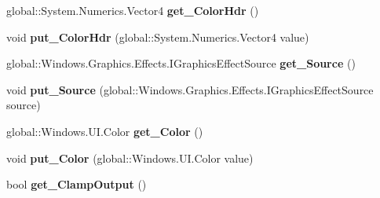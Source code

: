 \begin{DoxyCompactItemize}
global\+::\+System.\+Numerics.\+Vector4 {\bfseries get\+\_\+\+Color\+Hdr} ()
\item 
\mbox{\label{interface_microsoft_1_1_graphics_1_1_canvas_1_1_effects_1_1_i_tint_effect_ad0bd40be0fe7e352f9d1a9407f7c32a8}} 
void {\bfseries put\+\_\+\+Color\+Hdr} (global\+::\+System.\+Numerics.\+Vector4 value)
\item 
\mbox{\label{interface_microsoft_1_1_graphics_1_1_canvas_1_1_effects_1_1_i_tint_effect_aaf0626b4108a593e2255ee54368f6526}} 
global\+::\+Windows.\+Graphics.\+Effects.\+I\+Graphics\+Effect\+Source {\bfseries get\+\_\+\+Source} ()
\item 
\mbox{\label{interface_microsoft_1_1_graphics_1_1_canvas_1_1_effects_1_1_i_tint_effect_a956f6e4a96e8243eaea0b5c74184238f}} 
void {\bfseries put\+\_\+\+Source} (global\+::\+Windows.\+Graphics.\+Effects.\+I\+Graphics\+Effect\+Source source)
\item 
\mbox{\label{interface_microsoft_1_1_graphics_1_1_canvas_1_1_effects_1_1_i_tint_effect_a9740906fbd4edf788c38a4ffe4f56c9f}} 
global\+::\+Windows.\+U\+I.\+Color {\bfseries get\+\_\+\+Color} ()
\item 
\mbox{\label{interface_microsoft_1_1_graphics_1_1_canvas_1_1_effects_1_1_i_tint_effect_a9a8048767dbe8e55365b0088713b81aa}} 
void {\bfseries put\+\_\+\+Color} (global\+::\+Windows.\+U\+I.\+Color value)
\item 
\mbox{\label{interface_microsoft_1_1_graphics_1_1_canvas_1_1_effects_1_1_i_tint_effect_a4cac70c0257b0afafba73f50651187dc}} 
bool {\bfseries get\+\_\+\+Clamp\+Output} ()
\item 
\mbox{\label{interface_microsoft_1_1_graphics_1_1_canvas_1_1_effects_1_1_i_tint_effect_ae2e523533c05f903031fbbb09375c030}} 

\end{DoxyCompactItemize}
